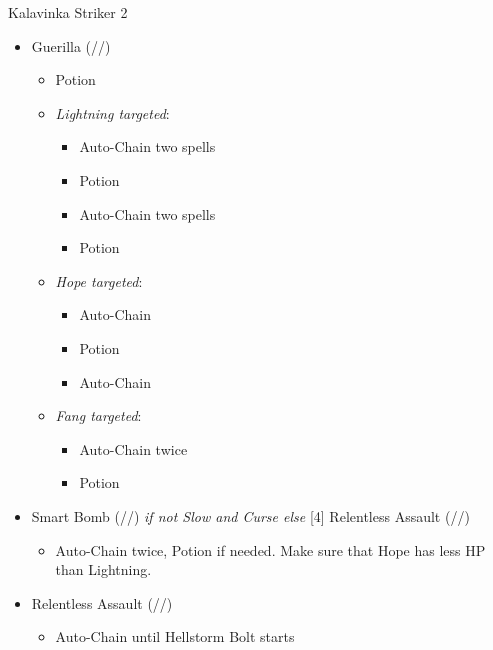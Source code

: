 	\renewcommand{\first}{[1] Guerilla (\rav/\syn/\sab)}
	\renewcommand{\second}{[2] Smart Bomb (\rav/\rav/\sab)}
	\renewcommand{\third}{[3] Relentless Assault (\rav/\rav/\com)}
	\renewcommand{\fourth}{[4] Relentless Assault (\rav/\rav/\com)}
	\renewcommand{\fifth}{[5] Aggression (\com/\rav/\com)}
	\begin{battle}[1:28]{Kalavinka Striker 2}
		\begin{itemize}
			\item \first
			      \begin{itemize}
				      \item Potion
				      \item \textit{Lightning targeted}:
				            \begin{itemize}
					            \item Auto-Chain two spells
					            \item Potion
					            \item Auto-Chain two spells
					            \item Potion
				            \end{itemize}
				      \item \textit{Hope targeted}:
				            \begin{itemize}
					            \item Auto-Chain
					            \item Potion
					            \item Auto-Chain
				            \end{itemize}
				      \item \textit{Fang targeted}:
				            \begin{itemize}
					            \item Auto-Chain twice
					            \item Potion
				            \end{itemize}
			      \end{itemize}
			\item \second \textit{ if not Slow and Curse else} \fourth
			      \begin{itemize}
				      \item Auto-Chain twice, Potion if needed. Make sure that Hope has less HP than Lightning.
			      \end{itemize}
			\item \third
			      \begin{itemize}
				      \item Auto-Chain until Hellstorm Bolt starts

\end{itemize}
\end{itemize}
\end{battle}
